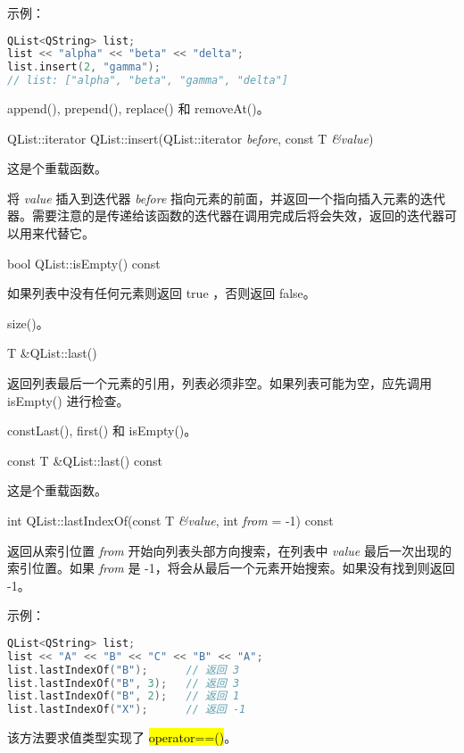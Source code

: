 示例：


\begin{lstlisting}[language=C++]
QList<QString> list;
list << "alpha" << "beta" << "delta";
list.insert(2, "gamma");
// list: ["alpha", "beta", "gamma", "delta"]
\end{lstlisting}



\begin{seeAlso}
append(), prepend(), replace() 和 removeAt()。
\end{seeAlso}

QList::iterator QList::insert(QList::iterator \emph{before}, const T \emph{\&value})

这是个重载函数。

将 \emph{value} 插入到迭代器 \emph{before} 指向元素的前面，并返回一个指向插入元素的迭代器。需要注意的是传递给该函数的迭代器在调用完成后将会失效，返回的迭代器可以用来代替它。

bool QList::isEmpty() const

如果列表中没有任何元素则返回 true ，否则返回 false。

\begin{seeAlso}
size()。
\end{seeAlso}


T \&QList::last()

返回列表最后一个元素的引用，列表必须非空。如果列表可能为空，应先调用 isEmpty() 进行检查。


\begin{seeAlso}
constLast(), first() 和 isEmpty()。
\end{seeAlso}


const T \&QList::last() const

这是个重载函数。

int QList::lastIndexOf(const T \emph{\&value}, int \emph{from} = -1) const

返回从索引位置 \emph{from} 开始向列表头部方向搜索，在列表中 \emph{value} 最后一次出现的索引位置。如果 \emph{from} 是 -1，将会从最后一个元素开始搜索。如果没有找到则返回 -1。

示例：

\begin{lstlisting}[language=C++]
QList<QString> list;
list << "A" << "B" << "C" << "B" << "A";
list.lastIndexOf("B");      // 返回 3
list.lastIndexOf("B", 3);   // 返回 3
list.lastIndexOf("B", 2);   // 返回 1
list.lastIndexOf("X");      // 返回 -1
\end{lstlisting}

该方法要求值类型实现了 \hl{operator==()}。

